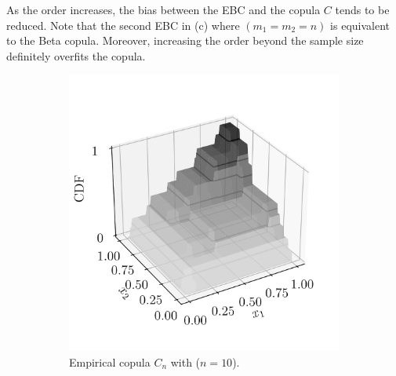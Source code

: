 As the order increases, the bias between the EBC and the copula $C$ tends to be reduced. 
Note that the second EBC in  (c) where $(m_1=m_2=n)$ is equivalent to the Beta copula. 
Moreover, increasing the order beyond the sample size definitely overfits the copula. 


\begin{figure}
    \begin{subfigure}[b]{0.49\textwidth}
        \centering
        \includegraphics[width=\linewidth]{../numerical_experiments/chapter3/figures/empirical_copula.png}
        \caption{Empirical copula $C_n$ with ($n=10$).}
    \end{subfigure}
    \begin{subfigure}[b]{0.49\textwidth}
        \centering

\end{subfigure}
\end{figure}
